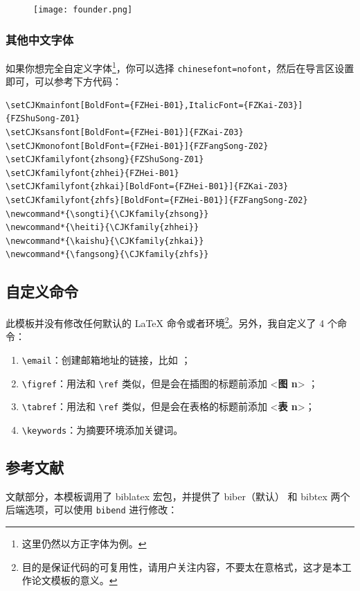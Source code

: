 \documentclass[lang=cn,a4paper]{elegantpaper}
\begin{document}
\begin{figure}[!htb]
\centering
\texttt{[image: founder.png]}
\end{figure}

\subsubsection{其他中文字体}
如果你想完全自定义字体\footnote{这里仍然以方正字体为例。}，你可以选择 \lstinline{chinesefont=nofont}，然后在导言区设置即可，可以参考下方代码：
\begin{lstlisting}
\setCJKmainfont[BoldFont={FZHei-B01},ItalicFont={FZKai-Z03}]{FZShuSong-Z01}
\setCJKsansfont[BoldFont={FZHei-B01}]{FZKai-Z03}
\setCJKmonofont[BoldFont={FZHei-B01}]{FZFangSong-Z02}
\setCJKfamilyfont{zhsong}{FZShuSong-Z01}
\setCJKfamilyfont{zhhei}{FZHei-B01}
\setCJKfamilyfont{zhkai}[BoldFont={FZHei-B01}]{FZKai-Z03}
\setCJKfamilyfont{zhfs}[BoldFont={FZHei-B01}]{FZFangSong-Z02}
\newcommand*{\songti}{\CJKfamily{zhsong}}
\newcommand*{\heiti}{\CJKfamily{zhhei}}
\newcommand*{\kaishu}{\CJKfamily{zhkai}}
\newcommand*{\fangsong}{\CJKfamily{zhfs}}
\end{lstlisting}



\subsection{自定义命令}
此模板并没有修改任何默认的 \LaTeX{} 命令或者环境\footnote{目的是保证代码的可复用性，请用户关注内容，不要太在意格式，这才是本工作论文模板的意义。}。另外，我自定义了 4 个命令：
\begin{enumerate}
  \item \lstinline{\email}：创建邮箱地址的链接，比如 ；
  \item \lstinline{\figref}：用法和 \lstinline{\ref} 类似，但是会在插图的标题前添加 <\textbf{图 n}> ；
  \item \lstinline{\tabref}：用法和 \lstinline{\ref} 类似，但是会在表格的标题前添加 <\textbf{表 n}>；
  \item \lstinline{\keywords}：为摘要环境添加关键词。
\end{enumerate}

\subsection{参考文献}

文献部分，本模板调用了 biblatex 宏包，并提供了 biber（默认） 和 bibtex 两个后端选项，可以使用 \lstinline{bibend} 进行修改：
\end{document}
